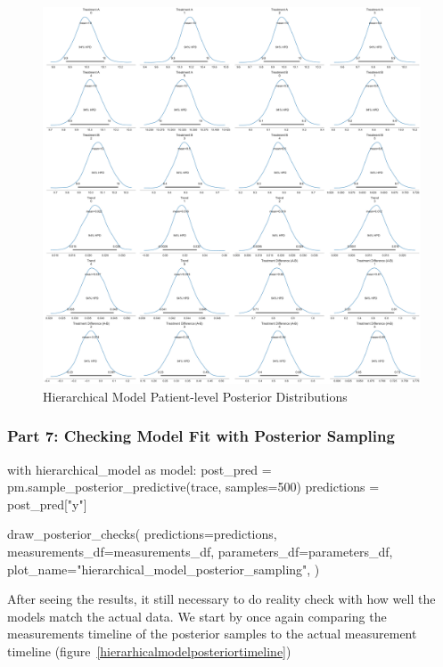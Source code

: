 \documentclass[12pt,a4paper,leqno]{report}
\theoremstyle{plain}
\theoremstyle{definition}
\theoremstyle{remark}
\begin{document}
\bigskip
\begin{figure}[H]
    \caption{Hierarchical Model Patient-level Posterior Distributions}\label{hierarchicalmodelpatientposteriors}
    \bigskip
    \includegraphics[width=\textwidth,height=\textheight,keepaspectratio]{hierarchical_model_patient_level_posteriors.pdf}
\end{figure}
\bigskip

\subsubsection*{Part 7: Checking Model Fit with Posterior Sampling}

\bigskip
\begin{pyverbatim}[][fontsize=\footnotesize]
with hierarchical_model as model:
    post_pred = pm.sample_posterior_predictive(trace, samples=500)
    predictions = post_pred["y"]

draw_posterior_checks(
    predictions=predictions,
    measurements_df=measurements_df,
    parameters_df=parameters_df,
    plot_name="hierarchical_model_posterior_sampling",
)
\end{pyverbatim}
\smallskip

After seeing the results, it still necessary to do reality check with how well the
models match the actual data. We start by once again comparing the measurements timeline
of the posterior samples to the actual measurement timeline (figure\ \ref{hierarhicalmodelposteriortimeline})
\end{document}
